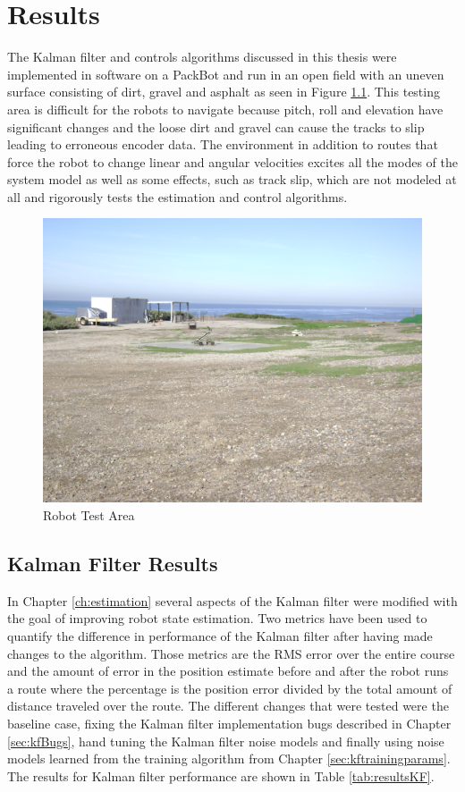 \chapter{Results}
\label{ch:results}
The Kalman filter and controls algorithms discussed in this thesis were implemented in software on a PackBot and run in an open field with an uneven surface consisting of dirt, gravel and asphalt as seen in Figure \ref{fig:resultsTestArea}. This testing area is difficult for the robots to navigate because pitch, roll and elevation have significant changes and the loose dirt and gravel can cause the tracks to slip leading to erroneous encoder data. The environment in addition to routes that force the robot to change linear and angular velocities excites all the modes of the system model as well as some effects, such as track slip, which are not modeled at all and rigorously tests the estimation and control algorithms.

\begin{figure}[ht!]
	\centering
	\includegraphics[width=.75\textwidth]{images/flightFieldTestArea}
	\caption{Robot Test Area}
	\label{fig:resultsTestArea}
\end{figure}

\section{Kalman Filter Results}
\label{sec:kfResults}
In Chapter \ref{ch:estimation} several aspects of the Kalman filter were modified with the goal of improving robot state estimation. Two metrics have been used to quantify the difference in performance of the Kalman filter after having made changes to the algorithm. Those metrics are the RMS error over the entire course and the amount of error in the position estimate before and after the robot runs a route where the percentage is the position error divided by the total amount of distance traveled over the route. The different changes that were tested were the baseline case, fixing the Kalman filter implementation bugs described in Chapter \ref{sec:kfBugs}, hand tuning the Kalman filter noise models and finally using noise models learned from the training algorithm from Chapter \ref{sec:kftrainingparams}. The results for Kalman filter performance are shown in Table \ref{tab:resultsKF}.

